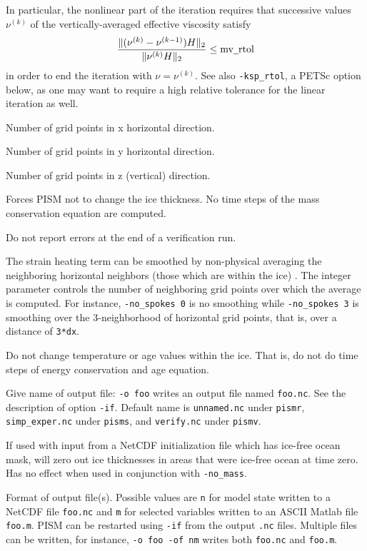 \documentclass[12pt,final]{amsart}
\begin{document}
In particular, the nonlinear part of the iteration requires that successive values $\nu^{(k)}$ of the vertically-averaged effective viscosity satisfy
	$$\frac{\|(\nu^{(k)} - \nu^{(k-1)}) H\|_2}{\|\nu^{(k)} H\|_2} \le \text{mv$\underline{\,\,\,}$rtol}$$
in order to end the iteration with $\nu = \nu^{(k)}$.  See also \verb|-ksp_rtol|, a PETSc option below, as one may want to require a high relative tolerance for the linear iteration as well.

  Number of grid points in x horizontal direction.

  Number of grid points in y horizontal direction.

  Number of grid points in z (vertical) direction.

  Forces PISM not to change the ice thickness.  No time steps of the mass conservation equation are computed.

  Do not report errors at the end of a verification run.

  The strain heating term can be smoothed by non-physical averaging the neighboring horizontal neighbors (those which are within the ice) \cite{BBL}.  The integer parameter controls the number of neighboring grid points over which the average is computed.  For instance, \verb|-no_spokes 0| is no smoothing while \verb|-no_spokes 3| is smoothing over the 3-neighborhood of horizontal grid points, that is, over a distance of \verb|3*dx|.

  Do not change temperature or age values within the ice.  That is, do not do time steps of energy conservation and age equation.

 Give name of output file: \verb|-o foo| writes an output file named \verb|foo.nc|.  See the description of option \verb|-if|.  Default name is \verb|unnamed.nc| under \verb|pismr|, \verb|simp_exper.nc| under \verb|pisms|, and \verb|verify.nc| under \verb|pismv|.

  If used with input from a NetCDF initialization file which has ice-free ocean mask, will zero out ice thicknesses in areas that were ice-free ocean at time zero.  Has no effect when used in conjunction with \verb|-no_mass|.

  Format of output file(s).  Possible values are \verb|n| for model state written to a NetCDF file \verb|foo.nc| and \verb|m| for selected variables written to an ASCII Matlab file \verb|foo.m|.  PISM can be restarted using \verb|-if| from the output \verb|.nc| files.  Multiple files can be written, for instance, \verb|-o foo -of nm| writes both \verb|foo.nc| and \verb|foo.m|.
\end{document}
